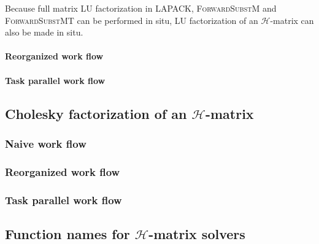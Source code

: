 \documentclass[11pt, a4paper]{book}
\begin{document}
Because full matrix LU factorization in LAPACK, \textsc{ForwardSubstM} and
\textsc{ForwardSubstMT} can be performed in situ, LU factorization of an
$\mathcal{H}$-matrix can also be made in situ.

\paragraph{Reorganized work flow}

\paragraph{Task parallel work flow}

\subsection{Cholesky factorization of an $\mathcal{H}$-matrix}

\subsubsection{Naive work flow}

\subsubsection{Reorganized work flow}

\subsubsection{Task parallel work flow}

\subsection{Function names for $\mathcal{H}$-matrix solvers}
\end{document}

